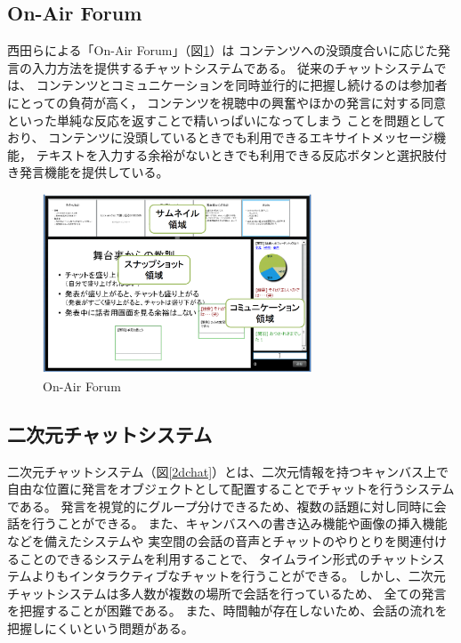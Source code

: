 \subsection{On-Air Forum}

西田らによる「On-Air Forum\cite{nishida2011}」（図\ref{onairforum}）は
コンテンツへの没頭度合いに応じた発言の入力方法を提供するチャットシステムである。
従来のチャットシステムでは、
コンテンツとコミュニケーションを同時並行的に把握し続けるのは参加者にとっての負荷が高く，
コンテンツを視聴中の興奮やほかの発言に対する同意といった単純な反応を返すことで精いっぱいになってしまう
ことを問題としており、
コンテンツに没頭しているときでも利用できるエキサイトメッセージ機能，
テキストを入力する余裕がないときでも利用できる反応ボタンと選択肢付き発言機能を提供している。

\begin{figure}[H]
\centering
\includegraphics[width=8cm]{images/onairforum.png}
\caption{On-Air Forum}
\label{onairforum}
\end{figure}

\subsection{二次元チャットシステム}

二次元チャットシステム（図\ref{2dchat}）とは、二次元情報を持つキャンバス上で
自由な位置に発言をオブジェクトとして配置することでチャットを行うシステムである。
発言を視覚的にグループ分けできるため、複数の話題に対し同時に会話を行うことができる。
また、キャンバスへの書き込み機能や画像の挿入機能などを備えたシステム\cite{kazama}や
実空間の会話の音声とチャットのやりとりを関連付けることのできるシステム\cite{110002711453}を利用することで、
タイムライン形式のチャットシステムよりもインタラクティブなチャットを行うことができる。
しかし、二次元チャットシステムは多人数が複数の場所で会話を行っているため、
全ての発言を把握することが困難である。
また、時間軸が存在しないため、会話の流れを把握しにくいという問題がある。

